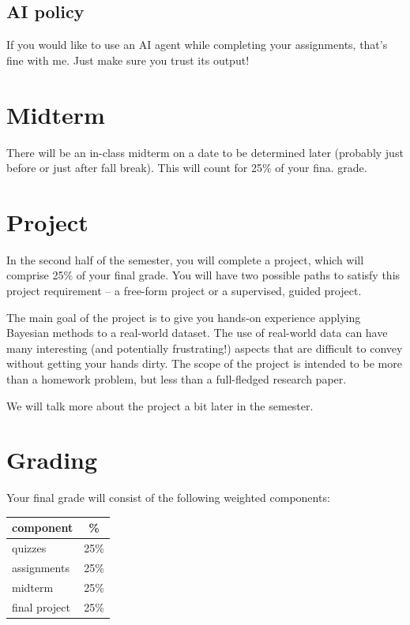 \documentclass{article}
\begin{document}
\subsection*{AI policy}

If you would like to use an AI agent while completing your assignments, that's
fine with me. Just make sure you trust its output!

\section*{Midterm}

There will be an in-class midterm on a date to be determined later
(probably just before or just after fall break). This will count for 25\% of your
fina. grade.

\section*{Project}

In the second half of the semester, you will complete a project, which will
comprise 25\% of your final grade.  You will have two possible paths to satisfy
this project requirement -- a free-form project or a supervised, guided project.

The main goal of the project is to give you hands-on experience applying
Bayesian methods to a real-world dataset.  The use of real-world data can have
many interesting (and potentially frustrating!) aspects that are difficult to
convey without getting your hands dirty.  The scope of the project is intended
to be more than a homework problem, but less than a full-fledged research paper.

We will talk more about the project a bit later in the semester.

\section*{Grading}

Your final grade will consist of the following weighted components:
\begin{center}
  \begin{tabular}{lc}
    \toprule
    component                    &   \% \\
    \midrule
    quizzes                      & 25\% \\
    assignments                  & 25\% \\
    midterm                      & 25\% \\
    final project                & 25\% \\
    \bottomrule
  \end{tabular}
\end{center}
\end{document}
